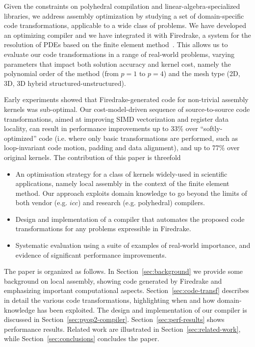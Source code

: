 \documentclass[conference]{IEEEtran}
\begin{document}


Given the constraints on polyhedral compilation and linear-algebra-specialized libraries, we address assembly optimization by studying a set of domain-specific code transformations, applicable to a wide class of problems. We have developed an optimizing compiler and we have integrated it with Firedrake, a system for the resolution of PDEs based on the finite element method~\cite{firedrake}. This allows us to evaluate our code transformations in a range of real-world problems, varying parameters that impact both solution accuracy and kernel cost, namely the polynomial order of the method (from $p=1$ to $p=4$) and the mesh type (2D, 3D, 3D hybrid structured-unstructured). 

Early experiments showed that Firedrake-generated code for non-trivial assembly kernels was sub-optimal. Our cost-model-driven sequence of source-to-source code transformations, aimed at improving SIMD vectorization and register data locality, can result in performance improvements up to 33$\%$ over ``softly-optimized'' code (i.e. where only basic transformations are performed, such as loop-invariant code motion, padding and data alignment), and up to 77$\%$ over original kernels. The contribution of this paper is threefold
\begin{itemize}
\item An optimisation strategy for a class of kernels widely-used in scientific applications, namely local assembly in the context of the finite element method. Our approach exploits domain knowledge to go beyond the limits of both vendor (e.g. $icc$) and research (e.g. polyhedral) compilers.
\item Design and implementation of a compiler that automates the proposed code transformations for any problems expressible in Firedrake.
\item Systematic evaluation using a suite of examples of real-world importance, and evidence of significant performance improvements.
\end{itemize}

The paper is organized as follows. In Section~\ref{sec:background} we provide some background on local assembly, showing code generated by Firedrake and emphasizing important computational aspects. Section~\ref{sec:code-transf} describes in detail the various code transformations, highlighting when and how domain-knowledge has been exploited. The design and implementation of our compiler is discussed in Section~\ref{sec:pyop2-compiler}. Section~\ref{sec:perf-results} shows performance results. Related work are illustrated in Section~\ref{sec:related-work}, while Section~\ref{sec:conclusions} concludes the paper.
\end{document}
